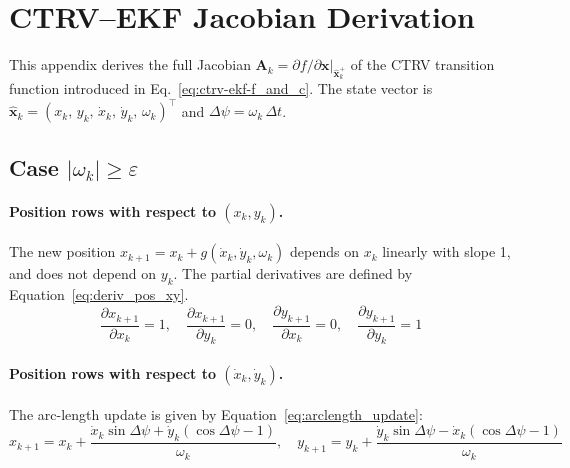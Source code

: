 \FloatBarrier









\section{CTRV--EKF Jacobian Derivation}
\label{app:ctrv-jacobian}

This appendix derives the full Jacobian $\mathbf{A}_k = \partial f /
\partial \mathbf{x}|_{\hat{\mathbf{x}}^+_k}$ of the CTRV transition
function introduced in Eq.~\eqref{eq:ctrv-ekf-f_and_c}. 
The state vector is $\hat{\mathbf{x}}_k = (x_k,\, y_k,\, \dot{x}_k,\, \dot{y}_k,\, \omega_k)^\top$ and $\Delta\psi = \omega_k\,\Delta t$.

\subsection*{Case $|\omega_k| \geq \varepsilon$}

\paragraph{Position rows with respect to $(x_k, y_k)$.}
The new position $x_{k+1} = x_k + g(\dot{x}_k, \dot{y}_k, \omega_k)$ depends on $x_k$
linearly with slope 1, and does not depend on $y_k$. The partial derivatives are defined by Equation~\ref{eq:deriv_pos_xy}.
\begin{equation}
    \frac{\partial x_{k+1}}{\partial x_k} = 1, \quad
    \frac{\partial x_{k+1}}{\partial y_k} = 0, \quad
    \frac{\partial y_{k+1}}{\partial x_k} = 0, \quad
    \frac{\partial y_{k+1}}{\partial y_k} = 1
    \label{eq:deriv_pos_xy}
\end{equation}

\paragraph{Position rows with respect to $(\dot{x}_k, \dot{y}_k)$.}
The arc-length update is given by Equation~\ref{eq:arclength_update}:
\begin{equation}
    x_{k+1} = x_k + \frac{\dot{x}_k\sin\Delta\psi + \dot{y}_k(\cos\Delta\psi - 1)}{\omega_k},\quad
    y_{k+1} = y_k + \frac{\dot{y}_k\sin\Delta\psi - \dot{x}_k(\cos\Delta\psi - 1)}{\omega_k}
    \label{eq:arclength_update}
\end{equation}


